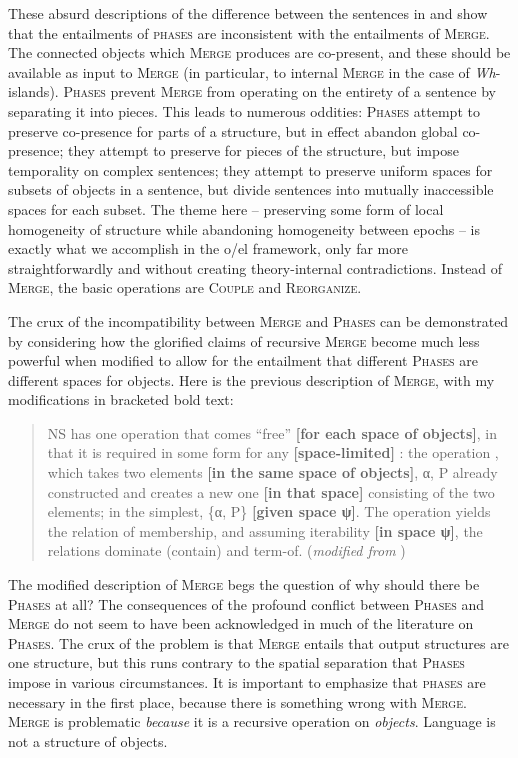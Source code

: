     These absurd descriptions of the difference between the sentences in  and  show that the entailments of  \textsc{phases} are inconsistent with the entailments of \textsc{Merge}. The connected objects which \textsc{Merge} produces are co-present, and these should be available as input to \textsc{Merge} (in particular, to internal \textsc{Merge} in the case of \textit{Wh}-islands). \textsc{Phases} prevent \textsc{Merge} from operating on the entirety of a sentence by separating it into pieces. This leads to numerous oddities: \textsc{Phases} attempt to preserve co-presence for parts of a structure, but in effect abandon global co-presence; they attempt to preserve  for pieces of the structure, but impose temporality on complex sentences; they attempt to preserve uniform spaces for subsets of objects in a sentence, but divide sentences into mutually inaccessible spaces for each subset. The theme here -- preserving some form of local homogeneity of structure while abandoning homogeneity between epochs -- is exactly what we accomplish in the o/el framework, only far more straightforwardly and without creating theory-internal contradictions. Instead of \textsc{Merge}, the basic operations are \textsc{Couple} and \textsc{Reorganize}.

  The crux of the incompatibility between \textsc{Merge} and \textsc{Phases} can be demonstrated by considering how the glorified claims of recursive \textsc{Merge} become much less powerful when modified to allow for the entailment that different \textsc{Phases} are different spaces for objects. Here is the previous description of \textsc{Merge}, with my modifications in bracketed bold text:

\begin{quote} 
NS has one operation that comes “free” \textbf{[for each space of objects]}, in that it is required in some form for any \textbf{[space-limited]} : the operation , which takes two elements \textbf{[in the same space of objects]}, α, P already constructed and creates a new one \textbf{[in that space]} consisting of the two elements; in the simplest, \{α, P\} \textbf{[given space ψ]}. The operation yields the relation of membership, and assuming iterability \textbf{[in space ψ]}, the relations dominate (contain) and term-of. (\textit{modified from} \citep[6]{Chomsky2001})
\end{quote}

  The modified description of \textsc{Merge} begs the question of why should there be \textsc{Phases} at all? The consequences of the profound conflict between \textsc{Phases} and \textsc{Merge} do not seem to have been acknowledged in much of the literature on \textsc{Phases}. The crux of the problem is that \textsc{Merge} entails that output structures are one structure, but this runs contrary to the spatial separation that \textsc{Phases} impose in various circumstances. It is important to emphasize that \textsc{phases} are necessary in the first place, because there is something wrong with \textsc{Merge}. \textsc{Merge} is problematic \textit{because} it is a recursive operation on \textit{objects}. Language is not a structure of objects.

